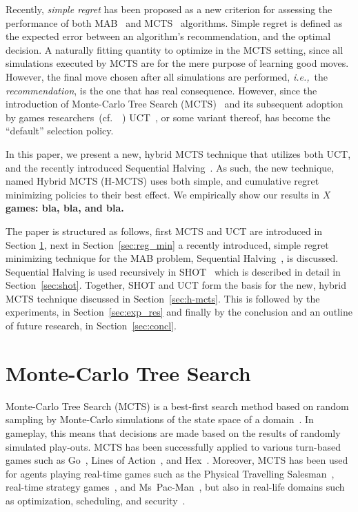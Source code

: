 \documentclass[a4paper]{llncs}
\newcommand{\ie}{{\it i.e.,}~}
\newcommand{\cf}{{cf.}~}
\newcommand{\TODO}[1]{\textbf{\color{red}#1}}
\begin{document}
Recently, \emph{simple regret} has been proposed as a new criterion for assessing the performance of both MAB~\cite{audibert2010best,Bubeck11Pure} and MCTS~\cite{tolpin2012mcts,Feldman12BRUE,Cazenave14SHOT} algorithms. Simple regret is defined as the expected error between an algorithm's recommendation, and the optimal decision. A naturally fitting quantity to optimize in the MCTS setting, since all simulations executed by MCTS are for the mere purpose of learning good moves. However, the final move chosen after all simulations are performed, \ie the \emph{recommendation}, is the one that has real consequence. However, since the introduction of Monte-Carlo Tree Search (MCTS)~\cite{kocsis2006bandit} and its subsequent adoption by games researchers~(\cf~\cite{browne2012survey}) UCT~\cite{kocsis2006bandit}, or some variant thereof, has become the ``default'' selection policy. 

\vspace{2mm}
In this paper, we present a new, hybrid MCTS technique that utilizes both UCT, and the recently introduced Sequential Halving~\cite{Karnin13SH}. As such, the new technique, named Hybrid MCTS (H-MCTS) uses both simple, and cumulative regret minimizing policies to their best effect. We empirically show our results in \TODO{$X$ games: bla, bla, and bla.}

The paper is structured as follows, first MCTS and UCT are introduced in Section \ref{sec:mcts}, next in Section~\ref{sec:reg_min} a recently introduced, simple regret minimizing technique for the MAB problem, Sequential Halving~\cite{Karnin13SH}, is discussed. Sequential Halving is used recursively in SHOT~\cite{Cazenave14SHOT} which is described in detail in Section~\ref{sec:shot}. Together, SHOT and UCT form the basis for the new, hybrid MCTS technique discussed in Section~\ref{sec:h-mcts}. This is followed by the experiments, in Section~\ref{sec:exp_res} and finally by the conclusion and an outline of future research, in Section~\ref{sec:concl}.

\section{Monte-Carlo Tree Search}
\label{sec:mcts}

Monte-Carlo Tree Search (MCTS) is a best-first search method based on random sampling by Monte-Carlo simulations of the state space of a domain~\cite{coulom2007efficient,kocsis2006bandit}. In gameplay, this means that decisions are made based on the results of randomly simulated play-outs. MCTS has been successfully applied to various turn-based games such as Go~\cite{lee2010current}, Lines of Action~\cite{Winands2010b}, and Hex~\cite{arneson2010monte}. Moreover, MCTS has been used for agents playing real-time games such as the Physical Travelling Salesman~\cite{powleytsp}, real-time strategy games~\cite{balla2009uct}, and Ms~Pac-Man~\cite{realtime2014}, but also in real-life domains such as optimization, scheduling, and security~\cite{browne2012survey}.
\end{document}
